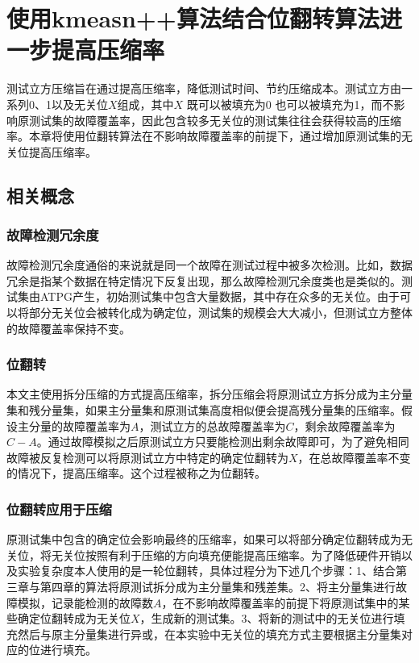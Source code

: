 
\chapter{使用kmeasn++算法结合位翻转算法进一步提高压缩率}

测试立方压缩旨在通过提高压缩率，降低测试时间、节约压缩成本。测试立方由一系列0、1以及无关位$X$组成，其中$X$ 既可以被填充为0 也可以被填充为1，而不影响原测试集的故障覆盖率，因此包含较多无关位的测试集往往会获得较高的压缩率。本章将使用位翻转算法在不影响故障覆盖率的前提下，通过增加原测试集的无关位提高压缩率。

\section{相关概念}

\subsection{故障检测冗余度}
故障检测冗余度通俗的来说就是同一个故障在测试过程中被多次检测。比如，数据冗余是指某个数据在特定情况下反复出现，那么故障检测冗余度类也是类似的。测试集由ATPG产生，初始测试集中包含大量数据，其中存在众多的无关位。由于可以将部分无关位会被转化成为确定位，测试集的规模会大大减小，但测试立方整体的故障覆盖率保持不变。

\subsection{位翻转}
本文主使用拆分压缩的方式提高压缩率，拆分压缩会将原测试立方拆分成为主分量集和残分量集，如果主分量集和原测试集高度相似便会提高残分量集的压缩率。假设主分量的故障覆盖率为$A$，测试立方的总故障覆盖率为$C$，剩余故障覆盖率为$C-A$。通过故障模拟之后原测试立方只要能检测出剩余故障即可，为了避免相同故障被反复检测可以将原测试立方中特定的确定位翻转为$X$，在总故障覆盖率不变的情况下，提高压缩率。这个过程被称之为位翻转。

\subsection{位翻转应用于压缩}
原测试集中包含的确定位会影响最终的压缩率，如果可以将部分确定位翻转成为无关位，将无关位按照有利于压缩的方向填充便能提高压缩率。为了降低硬件开销以及实验复杂度本人使用的是一轮位翻转，具体过程分为下述几个步骤：1、结合第三章与第四章的算法将原测试拆分成为主分量集和残差集。2、将主分量集进行故障模拟，记录能检测的故障数$A$，在不影响故障覆盖率的前提下将原测试集中的某些确定位翻转成为无关位$X$，生成新的测试集。3、将新的测试中的无关位进行填充然后与原主分量集进行异或，在本实验中无关位的填充方式主要根据主分量集对应的位进行填充。


